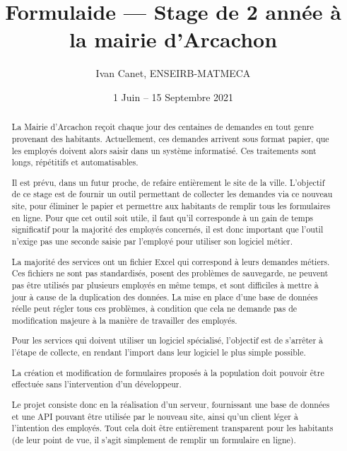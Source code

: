 \documentclass[11pt,french,openany]{memoir}
\begin{document}
	\renewcommand{\chaptername}{Partie}

	\frontmatter
	\title{Formulaide --- Stage de 2\ieme{} année à la mairie d'Arcachon}
	\date{1\ier{} Juin -- 15 Septembre 2021}
	\author{Ivan Canet, ENSEIRB-MATMECA}
	\maketitle

	\begin{abstract}
		La Mairie d'Arcachon reçoit chaque jour des centaines de demandes en tout genre provenant des habitants.
		Actuellement, ces demandes arrivent sous format papier, que les employés doivent alors saisir dans un système informatisé.
		Ces traitements sont longs, répétitifs et automatisables.

		Il est prévu, dans un futur proche, de refaire entièrement le site de la ville.
		L'objectif de ce stage est de fournir un outil permettant de collecter les demandes via ce nouveau site, pour éliminer le papier et permettre aux habitants de remplir tous les formulaires en ligne.
		Pour que cet outil soit utile, il faut qu'il corresponde à un gain de temps significatif pour la majorité des employés concernés, il est donc important que l'outil n'exige pas une seconde saisie par l'employé pour utiliser son logiciel métier.

		La majorité des services ont un fichier Excel qui correspond à leurs demandes métiers.
		Ces fichiers ne sont pas standardisés, posent des problèmes de sauvegarde, ne peuvent pas être utilisés par plusieurs employés en même temps, et sont difficiles à mettre à jour à cause de la duplication des données.
		La mise en place d'une base de données réelle peut régler tous ces problèmes, à condition que cela ne demande pas de modification majeure à la manière de travailler des employés.

		Pour les services qui doivent utiliser un logiciel spécialisé, l'objectif est de s'arrêter à l'étape de collecte, en rendant l'import dans leur logiciel le plus simple possible.

		La création et modification de formulaires proposés à la population doit pouvoir être effectuée sans l'intervention d'un développeur.

		\uparagraph
		Le projet consiste donc en la réalisation d'un serveur, fournissant une base de données
		et une API pouvant être utilisée par le nouveau site, ainsi qu'un client léger à l'intention des
		employés.
		Tout cela doit être entièrement transparent pour les habitants (de leur point de vue,
		il s'agit simplement de remplir un formulaire en ligne).
	\end{abstract}
\end{document}
